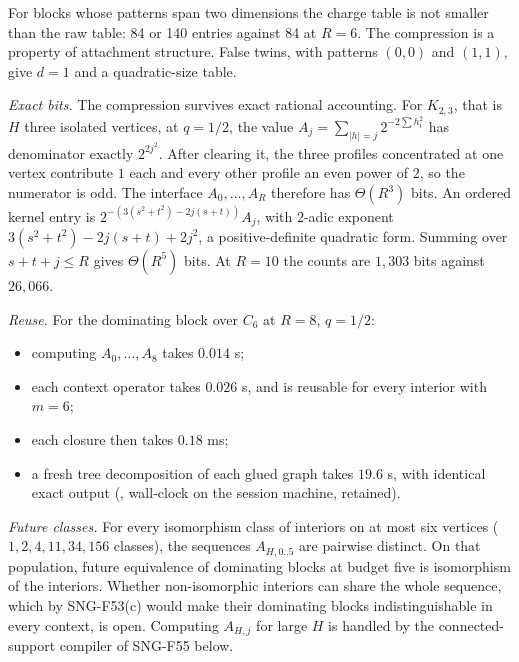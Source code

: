 \documentclass[
  11pt,
  a4paper,
]{report}
\providecommand{\tightlist}{%
  \setlength{\itemsep}{0pt}\setlength{\parskip}{0pt}}
\let\singularitytexttt\texttt
\renewcommand{\texttt}[1]{\singularitytexttt{\seqsplit{#1}}}
\begin{document}
For blocks whose patterns span two dimensions the charge table is not
smaller than the raw table: 84 or 140 entries against 84 at \(R=6\). The
compression is a property of attachment structure. False twins, with
patterns \((0,0)\) and \((1,1)\), give \(d=1\) and a quadratic-size
table.

\emph{Exact bits.} The compression survives exact rational accounting.
For \(K_{2,3}\), that is \(H\) three isolated vertices, at \(q=1/2\),
the value \(A_j=\sum_{|h|=j}2^{-2\sum h_i^2}\) has denominator exactly
\(2^{2j^2}\). After clearing it, the three profiles concentrated at one
vertex contribute \(1\) each and every other profile an even power of
\(2\), so the numerator is odd. The interface \(A_0,\ldots,A_R\)
therefore has \(\Theta(R^3)\) bits. An ordered kernel entry is
\(2^{-(3(s^2+t^2)-2j(s+t))}A_j\), with \(2\)-adic exponent
\(3(s^2+t^2)-2j(s+t)+2j^2\), a positive-definite quadratic form. Summing
over \(s+t+j\le R\) gives \(\Theta(R^5)\) bits. At \(R=10\) the counts
are \(1{,}303\) bits against \(26{,}066\).

\emph{Reuse.} For the dominating block over \(C_6\) at \(R=8\),
\(q=1/2\):

\begin{itemize}
\tightlist
\item
  computing \(A_0,\ldots,A_8\) takes \(0.014\) s;
\item
  each context operator takes \(0.026\) s, and is reusable for every
  interior with \(m=6\);
\item
  each closure then takes \(0.18\) ms;
\item
  a fresh tree decomposition of each glued graph takes \(19.6\) s, with
  identical exact output (\texttt{-\/-benchmark}, wall-clock on the
  session machine, retained).
\end{itemize}

\emph{Future classes.} For every isomorphism class of interiors on at
most six vertices (\(1,2,4,11,34,156\) classes), the sequences
\(A_{H,0..5}\) are pairwise distinct. On that population, future
equivalence of dominating blocks at budget five is isomorphism of the
interiors. Whether non-isomorphic interiors can share the whole
sequence, which by SNG-F53(c) would make their dominating blocks
indistinguishable in every context, is open. Computing \(A_{H,j}\) for
large \(H\) is handled by the connected-support compiler of SNG-F55
below.
\end{document}
